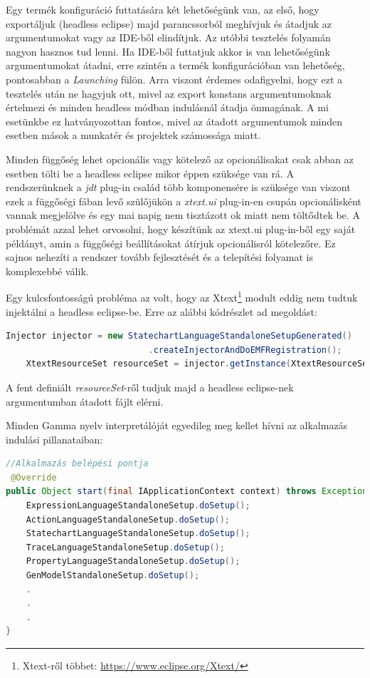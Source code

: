 Egy termék konfiguráció futtatására két lehetőségünk van, az első, hogy exportáljuk (headless eclipse) majd parancssorból meghívjuk és átadjuk az argumentumokat vagy az IDE-ből elindítjuk. Az utóbbi tesztelés folyamán nagyon hasznos tud lenni. Ha IDE-ből futtatjuk akkor is van lehetőségünk argumentumokat átadni, erre szintén a termék konfigurációban van lehetőség, pontosabban a \textit{Launching} fülön. Arra viszont érdemes odafigyelni, hogy ezt a tesztelés után ne hagyjuk ott, mivel az export konstans argumentumoknak értelmezi és minden headless módban indulásnál átadja önmagának. A mi esetünkbe ez hatványozottan fontos, mivel az átadott argumentumok minden esetben mások a munkatér és projektek számossága miatt.

Minden függőség lehet opcionális vagy kötelező az opcionálisakat csak abban az esetben tölti be a headless eclipse mikor éppen szüksége van rá. A rendszerünknek a \textit{jdt} plug-in család több komponensére is szüksége van viszont ezek a függőségi fában levő szülőjükön a \textit{xtext.ui} plug-in-en csupán opcionálisként vannak megjelölve és egy mai napig nem tisztázott ok miatt nem töltődtek be. A problémát azzal lehet orvosolni, hogy készítünk az xtext.ui plug-in-ből egy saját példányt, amin a függőségi beállításokat átírjuk opcionálisról kötelezőre. Ez sajnos nehezíti a rendszer tovább fejlesztését és a telepítési folyamat is komplexebbé válik.

Egy kulcsfontosságú probléma az volt, hogy az Xtext\footnote{Xtext-ről többet: \url{https://www.eclipse.org/Xtext/}} modult eddig nem tudtuk injektálni a headless eclipse-be. Erre az alábbi kódrészlet ad megoldást:
\begin{lstlisting}[language=Java]
 	Injector injector = new StatechartLanguageStandaloneSetupGenerated()
 							.createInjectorAndDoEMFRegistration();
 	XtextResourceSet resourceSet = injector.getInstance(XtextResourceSet.class);
\end{lstlisting}
A fent definiált \textit{resourceSet}-ről tudjuk majd a headless eclipse-nek argumentumban átadott fájlt elérni.

Minden Gamma nyelv interpretálóját egyedileg meg kellet hívni az alkalmazás indulási pillanataiban:

\begin{lstlisting}[language=Java]
//Alkalmazás belépési pontja
 @Override
public Object start(final IApplicationContext context) throws Exception {
	ExpressionLanguageStandaloneSetup.doSetup();
	ActionLanguageStandaloneSetup.doSetup();
	StatechartLanguageStandaloneSetup.doSetup();
	TraceLanguageStandaloneSetup.doSetup();
	PropertyLanguageStandaloneSetup.doSetup();        
	GenModelStandaloneSetup.doSetup();
	.
	.
	.
}
\end{lstlisting}

